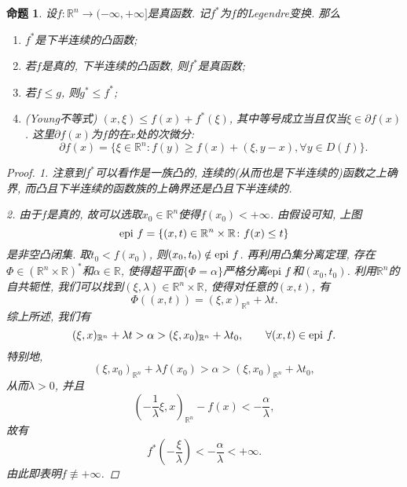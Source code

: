 \documentclass[12pt,a4paper]{article}
\newtheorem{proposition}[theorem]{命题}
\begin{document}
\begin{proposition}
    设$f\colon \mathbb{R}^n \rightarrow (-\infty, +\infty]$是真函数. 记$f^*$为$f$的Legendre变换.
    那么 
    \begin{enumerate}
        \item $f^*$是下半连续的凸函数;
        \item 若$f$是真的, 下半连续的凸函数, 则$f^*$是真函数;
        \item 若$f \leq g$, 则$g^* \leq f^*$; \label{prop2.63-3}
        \item (Young不等式) $(x, \xi) \leq f(x) + f^*(\xi)$, 其中等号成立当且仅当$\xi \in \partial f(x)$. \label{prop2.63-4}
        这里$\partial f(x)$为$f$的在$x$处的次微分:
        \begin{equation*}
            \partial f(x) = \{\xi \in \mathbb{R}^n\colon f(y) \geq f(x) + (\xi, y - x), \forall y \in D(f)\}.
        \end{equation*}
    \end{enumerate}
    \begin{proof}
        1. 注意到$f^*$可以看作是一族凸的, 连续的(从而也是下半连续的)函数之上确界, 而凸且下半连续的函数族的上确界还是凸且下半连续的.

        2. 由于$f$是真的, 故可以选取$x_0 \in \mathbb{R}^n$使得$f(x_0) < +\infty$.
        由假设可知, 上图
        \begin{equation*}
            {\rm epi}\ f = \{(x, t) \in \mathbb{R}^n \times \mathbb{R}\colon f(x) \leq t\}
        \end{equation*}
        是非空凸闭集. 取$t_0 < f(x_0)$, 则$(x_0, t_0) \notin {\rm epi}\ f$. 再利用凸集分离定理, 存在$\Phi \in (\mathbb{R}^n \times \mathbb{R})^*$和$\alpha \in \mathbb{R}$, 使得超平面$\{\Phi = \alpha\}$严格分离${\rm epi}\ f$和$(x_0, t_0)$.
        利用$\mathbb{R}^n$的自共轭性, 我们可以找到$(\xi, \lambda) \in \mathbb{R}^n \times \mathbb{R}$, 使得对任意的$(x, t)$, 有 
        \begin{equation*}
            \Phi((x, t)) = (\xi, x)_{\mathbb{R}^n} + \lambda t.
        \end{equation*}
        综上所述, 我们有 
        \begin{equation*}
            (\xi, x)_{\mathbb{R}^n} + \lambda t > \alpha > (\xi, x_0)_{\mathbb{R}^n} + \lambda t_0, \qquad \forall (x, t) \in {\rm epi}\ f.
        \end{equation*}
        特别地, 
        \begin{equation*}
            (\xi, x_0)_{\mathbb{R}^n} + \lambda f(x_0) > \alpha > (\xi, x_0)_{\mathbb{R}^n} + \lambda t_0,
        \end{equation*}
        从而$\lambda > 0$, 并且 
        \begin{equation*}
            \left(-\frac{1}{\lambda}\xi, x\right)_{\mathbb{R}^n} - f(x) < -\frac{\alpha}{\lambda},
        \end{equation*}
        故有 
        \begin{equation*}
            f^*\left(-\frac{\xi}{\lambda}\right) < -\frac{\alpha}{\lambda} < +\infty.
        \end{equation*}
        由此即表明$f \not\equiv +\infty$.
    

\end{proof}
\end{proposition}
\end{document}
